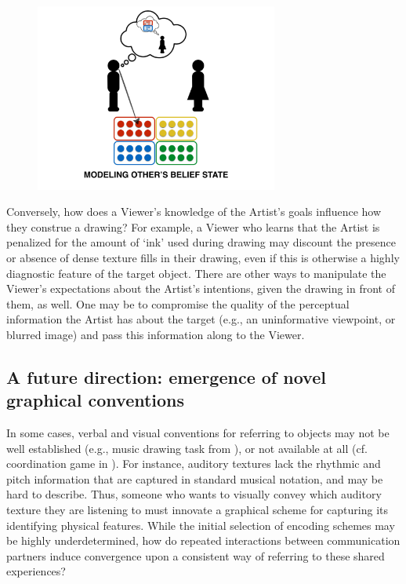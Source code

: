 \documentclass[12pt]{article}
\begin{document}
\begin{figure}[hbtp]
\begin{center}
\includegraphics[width=80mm]{figures/pragmatic_considerations.pdf}
\end{center}
\end{figure}
\vspace{-5mm}

Conversely, how does a Viewer's knowledge of the Artist's goals influence how they construe a drawing? For example, a Viewer who learns that the Artist is penalized for the amount of `ink' used during drawing may discount the presence or absence of dense texture fills in their drawing, even if this is otherwise a highly diagnostic feature of the target object. There are other ways to manipulate the Viewer's expectations about the Artist's intentions, given the drawing in front of them, as well. One may be to compromise the quality of the perceptual information the Artist has about the target (e.g., an uninformative viewpoint, or blurred image) and pass this information along to the Viewer.


\subsection{A future direction: emergence of novel graphical conventions}

In some cases, verbal and visual conventions for referring to objects may not be well established (e.g., music drawing task from ), or not available at all (cf. coordination game in ). For instance, auditory textures \cite{McDermott:2013ky} lack the rhythmic and pitch information that are captured in standard musical notation, and may be hard to describe. Thus, someone who wants to visually convey which auditory texture they are listening to must innovate a graphical scheme for capturing its identifying physical features. While the initial selection of encoding schemes may be highly underdetermined, how do repeated interactions between communication partners induce convergence upon a consistent way of referring to these shared experiences?


\setlength{\bibleftmargin}{.125in}
\setlength{\bibindent}{-\bibleftmargin}

\end{document}

